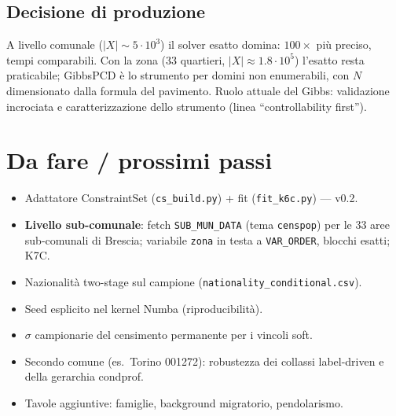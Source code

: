 \documentclass[11pt,a4paper]{article}
\newcommand{\code}[1]{\texttt{#1}}
\newcommand{\flow}[1]{\texttt{\small #1}}
\begin{document}
\subsection{Decisione di produzione}
A livello comunale ($|X| \sim 5\cdot10^3$) il solver esatto domina:
$100\times$ pi\`u preciso, tempi comparabili. Con la zona (33 quartieri,
$|X| \approx 1.8\cdot10^5$) l'esatto resta praticabile; GibbsPCD \`e lo
strumento per domini non enumerabili, con $N$ dimensionato dalla formula del
pavimento. Ruolo attuale del Gibbs: validazione incrociata e caratterizzazione
dello strumento (linea ``controllability first'').

\section{Da fare / prossimi passi}
\begin{itemize}[leftmargin=*]
  \item[$\boxtimes$] Adattatore ConstraintSet (\code{cs\_build.py}) + fit
  (\code{fit\_k6c.py}) --- v0.2.
  \item[$\square$] \textbf{Livello sub-comunale}: fetch \flow{SUB\_MUN\_DATA}
  (tema \code{censpop}) per le 33 aree sub-comunali di Brescia; variabile
  \code{zona} in testa a \code{VAR\_ORDER}, blocchi esatti; K7C.
  \item[$\square$] Nazionalit\`a two-stage sul campione
  (\code{nationality\_conditional.csv}).
  \item[$\square$] Seed esplicito nel kernel Numba (riproducibilit\`a).
  \item[$\square$] $\sigma$ campionarie del censimento permanente per i
  vincoli soft.
  \item[$\square$] Secondo comune (es.\ Torino 001272): robustezza dei
  collassi label-driven e della gerarchia condprof.
  \item[$\square$] Tavole aggiuntive: famiglie, background migratorio,
  pendolarismo.
\end{itemize}
\end{document}
